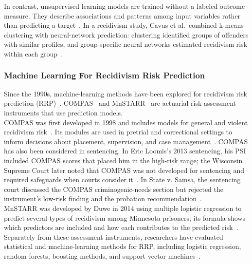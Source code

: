 \documentclass[12pt]{article}
\begin{document}
In contrast, unsupervised learning models are trained without a labeled outcome measure. They describe associations and patterns among input variables rather than predicting a target~\cite{duwe2017out}. In a recidivism study, Cavus et al.\ combined k-means clustering with neural-network prediction: clustering identified groups of offenders with similar profiles, and group-specific neural networks estimated recidivism risk within each group~\cite{cavus2025transparent}.\\

\subsubsection{Machine Learning For Recidivism Risk Prediction}
\tabto{2em} Since the 1990s, machine-learning methods have been explored for recidivism risk prediction (RRP)~\cite{duwe2017out}. COMPAS~\cite{northpointe2015practitioner} and MnSTARR~\cite{duwe2014development} are actuarial risk-assessment instruments that use prediction models.\\

COMPAS was first developed in 1998 and includes models for general and violent recidivism risk~\cite{northpointe2015practitioner}. Its modules are used in pretrial and correctional settings to inform decisions about placement, supervision, and case management~\cite{northpointe2015practitioner}. COMPAS has also been considered in sentencing. In Eric Loomis’s 2013 sentencing, his PSI included COMPAS scores that placed him in the high-risk range; the Wisconsin Supreme Court later noted that COMPAS was not developed for sentencing and required safeguards when courts consider it~\cite{loomis2016}. In State v. Samsa, the sentencing court discussed the COMPAS criminogenic-needs section but rejected the instrument’s low-risk finding and the probation recommendation~\cite{samsa2014}.\\

MnSTARR was developed by Duwe in 2014 using multiple logistic regression to predict several types of recidivism among Minnesota prisoners; its formula shows which predictors are included and how each contributes to the predicted risk~\cite{duwe2014development}.\\

Separately from these assessment instruments, researchers have evaluated statistical and machine-learning methods for RRP, including logistic regression, random forests, boosting methods, and support vector machines~\cite{duwe2017out,ozkan2017predicting,travaini2022machine}.
\end{document}
